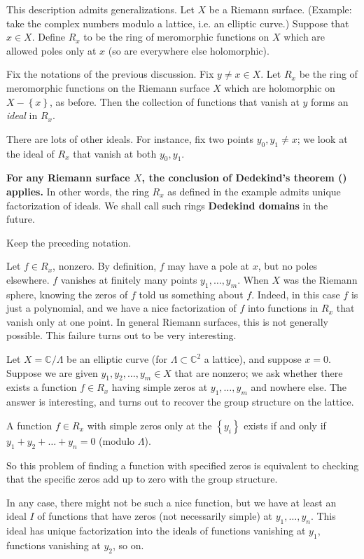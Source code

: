 This description admits generalizations. 
Let $X$ be a
Riemann surface.  (Example: take the complex numbers modulo a lattice, i.e. an
elliptic curve.)
Suppose that $x \in X$. Define $R_x$ to be the ring of meromorphic functions on $X$
which are allowed poles only at $x$ (so are everywhere else holomorphic). 

\begin{example} Fix the notations of the previous discussion. 
Fix $y \neq x \in X$. Let $R_x$ be the ring of meromorphic functions on the
Riemann surface $X$ which are holomorphic on $X - \left\{x\right\}$, as before.
Then the collection of functions that vanish at $y$ forms an
\emph{ideal} in $R_x$. 

There are lots of other ideals. For instance, fix two
points $y_0, y_1 \neq x$; we look at the ideal of $R_x$ that vanish at both $y_0, y_1$.

\end{example} 


\textbf{For any Riemann surface $X$, the conclusion of Dedekind's theorem
() applies.  } In other
words, the ring  $R_x$ as defined in the example admits  unique factorization of
ideals. We shall call such rings \textbf{Dedekind domains} in the future.

\begin{example} Keep the preceding notation.

Let $f \in R_x$, nonzero. By definition, $f$ may have a pole at $x$, but no poles elsewhere. $f$ vanishes
at finitely many points $y_1, \dots, y_m$. When $X$ was the Riemann sphere,
knowing the zeros of $f$ told us something about $f$. Indeed, in this case
$f$ is just a
polynomial, and we have a nice factorization of $f$ into functions in $R_x$ that vanish only
at one point. In general Riemann surfaces, this
is not generally possible.  This failure turns out to be very interesting.

Let $X = \mathbb{C}/\Lambda$ be an elliptic curve (for $\Lambda \subset
\mathbb{C}^2$ a lattice), and suppose $x = 0$. Suppose we
are given $y_1, y_2, \dots, y_m \in X$ that are nonzero; we ask whether there
exists a function $f \in R_x$ having simple zeros at $y_1, \dots, y_m$ and nowhere else.
The answer is interesting, and turns out to recover the group structure on the
lattice.

\begin{proposition} 
A function $f \in R_x$ with simple zeros only at the $\left\{y_i\right\}$ exists if and only if $y_1 + y_2 + \dots + y_n = 0$ (modulo $\Lambda$).

\end{proposition} 
So this problem of finding a function with specified zeros is equivalent to
checking that the specific zeros add up to zero with the group structure.

In any case, there might not be such a nice function, but we have at least an
ideal $I$ of functions that have zeros (not necessarily simple) at $y_1, \dots,
y_n$.  This ideal has unique factorization into the ideals of functions
vanishing at $y_1$, functions vanishing at $y_2$, so on.  
\end{example} 

